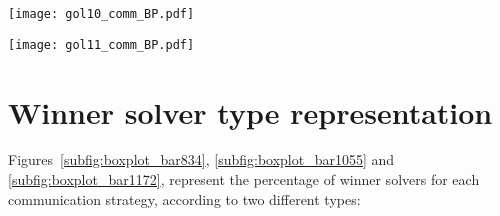 \begin{minipage}[c]{0.45\textwidth}
\centering
\texttt{[image: gol10\_comm\_BP.pdf]}
\label{boxplot:1055comm}
\end{minipage}\hspace{0.05\textwidth}
\begin{minipage}[c]{0.45\textwidth}
\centering
\texttt{[image: gol11\_comm\_BP.pdf]}
\label{boxplot:1172comm}
\end{minipage}


%

\section{Winner solver type representation}

Figures~\ref{subfig:boxplot_bar834}, \ref{subfig:boxplot_bar1055} and \ref{subfig:boxplot_bar1172}, represent the percentage of winner solvers for each communication strategy, according to two different types:



